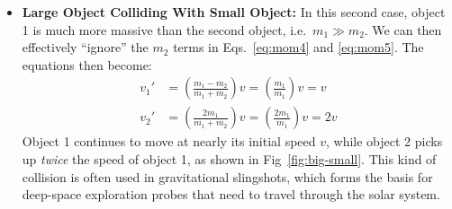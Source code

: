 \begin{itemize}[itemsep=6pt]
\item\textbf{Large Object Colliding With Small Object:} In this second case,
  object 1 is much more massive than the second object, i.e.\ $m_1\gg m_2$. We
  can then effectively ``ignore'' the $m_2$ terms in Eqs.~\ref{eq:mom4} and
  \ref{eq:mom5}. The equations then become:
  \begin{align*}
    v_1'&=\left(\frac{m_1-m_2}{m_1+m_2}\right)v=\left(\frac{m_1}{m_1}\right)v
    =v\\
    v_2'&=\left(\frac{2m_1}{m_1+m_2}\right)v=\left(\frac{2m_1}{m_1}\right)v=2v
  \end{align*}
  Object 1 continues to move at nearly its initial speed $v$, while object 2
  picks up \emph{twice} the speed of object 1, as shown in
  Fig~\ref{fig:big-small}. This kind of collision is often used in
  gravitational slingshots, which forms the basis for deep-space exploration
  probes that need to travel through the solar system.
  \begin{figure}[ht]
    \centering
\end{figure}
\end{itemize}

